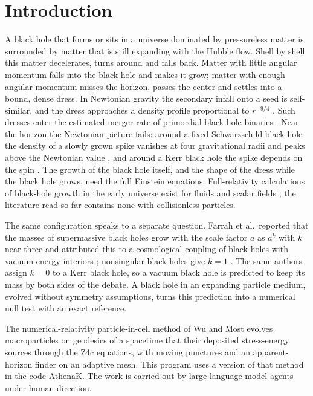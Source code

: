 \documentclass[aps,prd,twocolumn,10pt,superscriptaddress,nofootinbib,longbibliography,floatfix]{revtex4-2}
\begin{document}
\maketitle

\section{Introduction}\label{sec:intro}

A black hole that forms or sits in a universe dominated by pressureless matter is surrounded by matter that is still expanding with the Hubble flow. Shell by shell this matter decelerates, turns around and falls back. Matter with little angular momentum falls into the black hole and makes it grow; matter with enough angular momentum misses the horizon, passes the center and settles into a bound, dense dress. In Newtonian gravity the secondary infall onto a seed is self-similar, and the dress approaches a density profile proportional to $r^{-9/4}$ \cite{Adamek:2019wimp,Boudaud:2021spikes}. Such dresses enter the estimated merger rate of primordial black-hole binaries \cite{Kavanagh:2018dress}. Near the horizon the Newtonian picture fails: around a fixed Schwarzschild black hole the density of a slowly grown spike vanishes at four gravitational radii and peaks above the Newtonian value \cite{Sadeghian:2013spike}, and around a Kerr black hole the spike depends on the spin \cite{Ferrer:2017kerr}. The growth of the black hole itself, and the shape of the dress while the black hole grows, need the full Einstein equations. Full-relativity calculations of black-hole growth in the early universe exist for fluids and scalar fields \cite{deJong:2021pbh,Ning:2026rd}; the literature read so far contains none with collisionless particles.

The same configuration speaks to a separate question. Farrah et al.\ reported that the masses of supermassive black holes grow with the scale factor $a$ as $a^k$ with $k$ near three and attributed this to a cosmological coupling of black holes with vacuum-energy interiors \cite{Farrah:2023coupling}; nonsingular black holes give $k=1$ \cite{Cadoni:2023nonsingular}. The same authors assign $k=0$ to a Kerr black hole, so a vacuum black hole is predicted to keep its mass by both sides of the debate. A black hole in an expanding particle medium, evolved without symmetry assumptions, turns this prediction into a numerical null test with an exact reference.

The numerical-relativity particle-in-cell method of Wu and Most \cite{Wu:2026nrpic} evolves macroparticles on geodesics of a spacetime that their deposited stress-energy sources through the Z4c equations, with moving punctures and an apparent-horizon finder on an adaptive mesh. This program uses a version of that method in the code AthenaK. The work is carried out by large-language-model agents under human direction.
\end{document}
